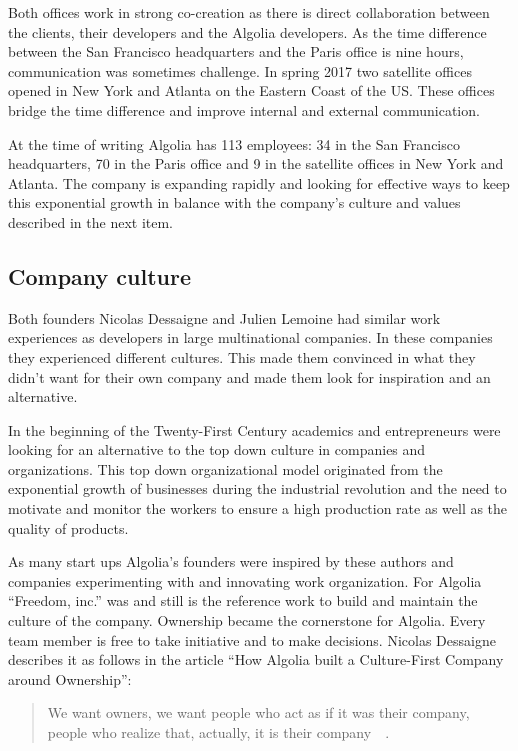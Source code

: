 Both offices work in strong co-creation as there is direct collaboration between the clients, their developers and the Algolia developers. As the time difference between the San Francisco headquarters and the Paris office is nine hours, communication was sometimes challenge. In spring 2017 two satellite offices opened in New York and Atlanta on the Eastern Coast of the US. These offices bridge the time difference and improve internal and external communication.

At the time of writing Algolia has 113 employees: 34 in the San Francisco headquarters, 70 in the Paris office and 9 in the satellite offices in New York and Atlanta. The company is expanding rapidly and looking for effective ways to keep this exponential growth in balance with the company’s culture and values described in the next item.

\subsection{Company culture}
\label{sub:company_culture}

Both founders Nicolas Dessaigne and Julien Lemoine had similar work experiences as developers in large multinational companies. In these companies they experienced different cultures. This made them convinced in what they didn't want for their own company and made them look for inspiration and an alternative.

In the beginning of the Twenty-First Century academics and entrepreneurs were looking for an alternative to the top down culture in companies and organizations. This top down organizational model originated from the exponential growth of businesses during the industrial revolution and the need to motivate and monitor the workers to ensure a high production rate as well as the quality of products.


As many start ups Algolia’s founders were inspired by these authors and companies experimenting with and innovating work organization. For Algolia ``Freedom, inc.''\cite{freedom-inc} was and still is the reference work to build and maintain the culture of the company. Ownership became the cornerstone for Algolia. Every team member is free to take initiative and to make decisions. Nicolas Dessaigne describes it as follows in the article ``How Algolia built a Culture-First Company around Ownership'':

\begin{quote}
We want owners, we want people who act as if it was their company, people who realize that, actually, it is their company~\cite{culture-first}~.
\end{quote}

